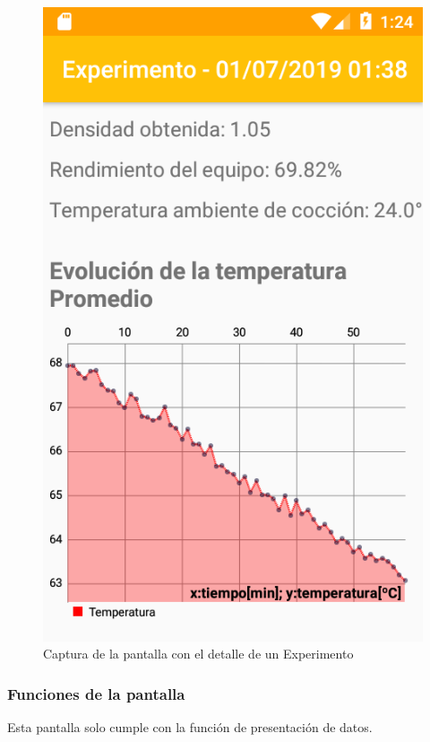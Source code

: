             \begin{figure}[h]
                \centering
                \includegraphics[scale=0.2]{software/ScreenCapture/DetailExperimentActivity.jpg}
                \caption{Captura de la pantalla con el detalle de un Experimento}
                \label{fig:CapturaDetExpAct}
            \end{figure}
            
            \subsubsection{Funciones de la pantalla}
                \par Esta pantalla solo cumple con la función de presentación de datos.
            

